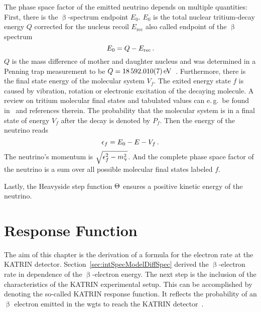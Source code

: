 The phase space factor of the emitted neutrino  depends on multiple quantities: First, there is the $\upbeta$-spectrum endpoint $E_0$. $E_0$ is the total nuclear tritium-decay energy $Q$ corrected for the nucleus recoil $E_\mathrm{rec}$ also called endpoint of the $\upbeta$ spectrum
\begin{equation}
\label{eq:intSpecModelEndpoint}
E_0 = Q-E_\mathrm{rec}
\text{\,.}
\end{equation}
$Q$ is the mass difference of mother and daughter nucleus and was determined in a Penning trap measurement to be $Q=\SI{18592.01\pm0.007}{eV}$~\cite{Myers2015}. Furthermore, there is the final state energy of the molecular system $V_f$. The exited energy state $f$ is caused by vibration, rotation or electronic excitation of the decaying molecule. A review on tritium molecular final states and tabulated values can e.\,g.~be found in~\cite{Bodine2015} and references therein.  The probability that the molecular system is in a final state of energy $V_f$ after the decay is denoted by $P_f$. Then the energy of the neutrino reads 
\begin{equation}
\epsilon_f = E_0 - E - V_f 
\text{\,.}
\end{equation}
The neutrino's momentum is $\sqrt{\epsilon_f^2-m_\upnu^2}$. And the complete phase space factor of the neutrino is a sum over all possible molecular final states labeled $f$.

Lastly, the Heavyside step function $\Theta$ ensures a positive kinetic energy of the neutrino.

\section{Response Function}
The aim of this chapter is the derivation of a formula for the electron rate at the KATRIN detector. Section~\ref{sec:intSpecModelDiffSpec} derived the $\upbeta$-electron rate in dependence of the $\upbeta$-electron energy. The next step is the inclusion of the characteristics of the KATRIN experimental setup. This can be accomplished by denoting the so-called KATRIN response function. It reflects the probability of an $\upbeta$ electron emitted in the \gls{wgts} to reach the KATRIN detector~\cite{Groh2015}.


